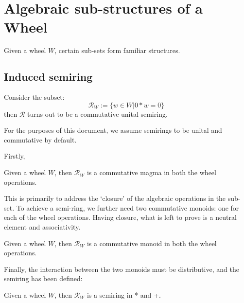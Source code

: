\section{Algebraic sub-structures of a Wheel} 
Given a wheel $W$, certain sub-sets form familiar structures. 
\subsection{Induced semiring}
Consider the subset:
\[
\mathcal{R}_{W} := \{ w \in W | 0*w = 0 \}
\]
then $\mathcal{R}$ turns out to be a commutative unital semiring.
\begin{remark}
 For the purposes of this document, we assume semirings to be unital and commutative by default.
\end{remark}
Firstly,
\begin{definition}
  \leanok
  Given a wheel $W$, then $\mathcal{R}_{W}$ is a commutative magma in both the wheel operations.
\end{definition}
This is primarily to address the `closure' of the algebraic operations in the sub-set. To achieve a semi-ring,
we further need two commutative monoids: one for each of the wheel operations. Having closure, what is left to prove is
a neutral element and associativity.
\begin{definition}
  \leanok
  Given a wheel $W$, then $\mathcal{R}_{W}$ is a commutative monoid in both the wheel operations.
\end{definition}
Finally, the interaction between the two monoids must be distributive, and the semiring has been defined:
\begin{definition}
  Given a wheel $W$, then $\mathcal{R}_{W}$ is a semiring in * and +.
\end{definition}
